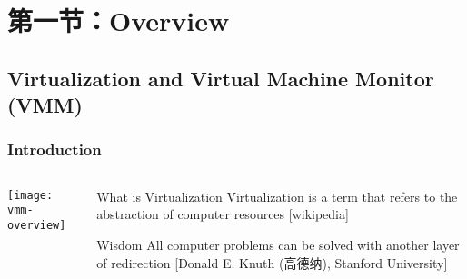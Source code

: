 \section{第一节：Overview} %
\subsection{Virtualization and Virtual Machine Monitor (VMM)}
\begin{frame}%
	\frametitle{Introduction}
	
	
	
	\begin{columns}
		
		\begin{column}{.4\textwidth}
			
			\texttt{[image: vmm-overview]}
			
		\end{column}
		
		\begin{column}{.6\textwidth}
			
		
			\begin{block}{What is Virtualization}
				Virtualization is a term that refers to the abstraction of computer resources [wikipedia]
			\end{block}
		
			\begin{block}{Wisdom}
				All computer problems can be solved with another layer of redirection [Donald E. Knuth (高德纳), Stanford University]
			\end{block}

		\end{column}
		
		
	\end{columns}
	
	
\end{frame}

